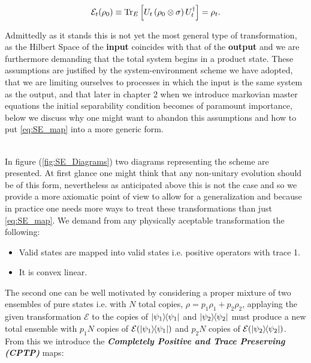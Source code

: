 \begin{equation} \label{eq:SE_map}
 \mathcal{E}_{t}(\rho_{0}) \equiv \mathrm{Tr}_{E}\left[U_{t}\left(\rho_{0}\otimes \sigma\right)U_{t}^{\dagger}\right] = \rho_{t}.
\end{equation}

Admittedly as it stands this is not yet the most general type of transformation, as the Hilbert Space of the \textbf{input} coincides with that
of the \textbf{output} and we are furthermore demanding that the total system begins in a product state. These assumptions are justified
by the system-environment scheme we have adopted, that we are limiting ourselves to processes in which the input is the same system as the output, and that later in chapter 2 when we introduce markovian master equations the initial separability condition becomes of paramount
importance, below we discuss why one might want to abandon this assumptions and how to put \eqref{eq:SE_map} into a more generic form.

\\
In figure (\ref{fig:SE_Diagrams}) two diagrams representing the scheme are presented. At first glance one might think that any non-unitary
evolution should be of this form, nevertheless as anticipated above this is not the case and so we provide a more axiomatic point of view to
allow for a generalization and because in practice one needs more ways to treat these transformations than just \eqref{eq:SE_map}. We demand from any physically aceptable transformation the following:

\begin{itemize}
  \item Valid states are mapped into valid states i.e. positive operators with trace 1.
  \item It is convex linear.
\end{itemize}
The second one can be well motivated by considering a proper mixture of two ensembles of pure states i.e. with $N$ total copies, $\rho =
p_{1}\rho_{1} + p_{2}\rho_{2}$, applaying the given transformation $\mathcal{E}$ to the copies of  $\ketbra{\psi_{1}}$ and $\ketbra{\psi_{2}}$  must produce a new total ensemble with $p_{1}N$ copies of $\mathcal{E}(\ketbra{\psi_{1}})$ and $p_{2}N$ copies of
$\mathcal{E}(\ketbra{\psi_{2}})$. From this we introduce the \textit{\textbf{Completely Positive and Trace Preserving (CPTP)}} maps:


